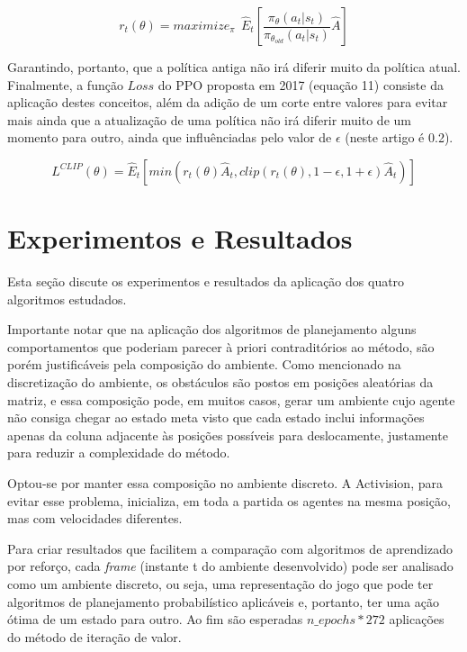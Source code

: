 \documentclass[letterpaper]{article} %
\begin{document}
\begin{equation}
r_t(\theta) = maximize_\pi \ \ \hat{E}_t \left[ \frac{\pi_{\theta}(a_t|s_t)}{\pi_{\theta_{old}}(a_t | s_t)} \hat{A} \right]
\end{equation}

Garantindo, portanto, que a política antiga não irá diferir muito da política atual. Finalmente, a função $Loss$ do PPO proposta em 2017 (equação 11) consiste da aplicação destes conceitos, além da adição de um corte entre valores para evitar mais ainda que a atualização de uma política não irá diferir muito de um momento para outro, ainda que influênciadas pelo valor de $\epsilon$ (neste artigo é 0.2).

\begin{equation}
L^{CLIP}(\theta) =  \hat{E}_t[min(r_t(\theta) \hat{A}_t, clip(r_t(\theta), 1 - \epsilon, 1 + \epsilon) \hat{A}_t)]
\end{equation}


\section{Experimentos e Resultados}
Esta seção discute os experimentos e resultados da aplicação dos quatro algoritmos estudados.

Importante notar que na aplicação dos algoritmos de planejamento alguns comportamentos que poderiam parecer à priori contraditórios ao método, são porém justificáveis pela composição do ambiente. Como mencionado na discretização do ambiente, os obstáculos são postos em posições aleatórias da matriz, e essa composição pode, em muitos casos, gerar um ambiente cujo agente não consiga chegar ao estado meta visto que cada estado inclui informações apenas da coluna adjacente às posições possíveis para deslocamente, justamente para reduzir a complexidade do método.

Optou-se por manter essa composição no ambiente discreto. A Activision, para evitar esse problema, inicializa, em toda a partida os agentes na mesma posição, mas com velocidades diferentes.

Para criar resultados que facilitem a comparação com algoritmos de aprendizado por reforço, cada \textit{frame} (instante t do ambiente desenvolvido) pode ser analisado como um ambiente discreto, ou seja, uma representação do jogo que pode ter algoritmos de planejamento probabilístico aplicáveis e, portanto, ter uma ação ótima de um estado para outro. Ao fim são esperadas $n\_epochs * 272$  aplicações do método de iteração de valor. 
\end{document}
